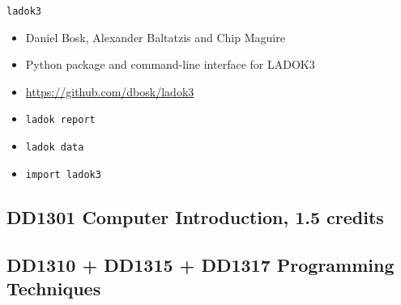 \begin{frame}[fragile]
  \begin{block}{\texttt{ladok3}}
    \begin{itemize}
      \item Daniel Bosk, Alexander Baltatzis and Chip Maguire
      \item Python package and command-line interface for LADOK3
      \item \url{https://github.com/dbosk/ladok3}
    \end{itemize}
  \end{block}

  \begin{example}
    \begin{itemize}
      \item \texttt{ladok report}
      \item \texttt{ladok data}

        \pause

      \item \texttt{import ladok3}
    \end{itemize}
  \end{example}
\end{frame}

\subsection{DD1301 Computer Introduction, 1.5 credits}


\subsection{DD1310 + DD1315 + DD1317 Programming Techniques}

